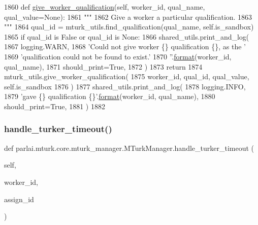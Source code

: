 \begin{DoxyCode}
1860     \textcolor{keyword}{def }\hyperlink{namespaceparlai_1_1mturk_1_1core_1_1dev_1_1mturk__utils_a631fbce36ff4d09422f29513460bc744}{give\_worker\_qualification}(self, worker\_id, qual\_name, qual\_value=None):
1861         \textcolor{stringliteral}{"""}
1862 \textcolor{stringliteral}{        Give a worker a particular qualification.}
1863 \textcolor{stringliteral}{        """}
1864         qual\_id = mturk\_utils.find\_qualification(qual\_name, self.is\_sandbox)
1865         \textcolor{keywordflow}{if} qual\_id \textcolor{keywordflow}{is} \textcolor{keyword}{False} \textcolor{keywordflow}{or} qual\_id \textcolor{keywordflow}{is} \textcolor{keywordtype}{None}:
1866             shared\_utils.print\_and\_log(
1867                 logging.WARN,
1868                 \textcolor{stringliteral}{'Could not give worker \{\} qualification \{\}, as the '}
1869                 \textcolor{stringliteral}{'qualification could not be found to exist.'}
1870                 \textcolor{stringliteral}{''}.\hyperlink{namespaceparlai_1_1chat__service_1_1services_1_1messenger_1_1shared__utils_a32e2e2022b824fbaf80c747160b52a76}{format}(worker\_id, qual\_name),
1871                 should\_print=\textcolor{keyword}{True},
1872             )
1873             \textcolor{keywordflow}{return}
1874         mturk\_utils.give\_worker\_qualification(
1875             worker\_id, qual\_id, qual\_value, self.is\_sandbox
1876         )
1877         shared\_utils.print\_and\_log(
1878             logging.INFO,
1879             \textcolor{stringliteral}{'gave \{\} qualification \{\}'}.\hyperlink{namespaceparlai_1_1chat__service_1_1services_1_1messenger_1_1shared__utils_a32e2e2022b824fbaf80c747160b52a76}{format}(worker\_id, qual\_name),
1880             should\_print=\textcolor{keyword}{True},
1881         )
1882 
\end{DoxyCode}
\mbox{\label{classparlai_1_1mturk_1_1core_1_1mturk__manager_1_1MTurkManager_ab93fd934d00fbf971ca299e77db152d5}} 
\subsubsection{\texorpdfstring{handle\+\_\+turker\+\_\+timeout()}{handle\_turker\_timeout()}}
{\footnotesize\ttfamily def parlai.\+mturk.\+core.\+mturk\+\_\+manager.\+M\+Turk\+Manager.\+handle\+\_\+turker\+\_\+timeout (\begin{DoxyParamCaption}\item[{}]{self,  }\item[{}]{worker\+\_\+id,  }\item[{}]{assign\+\_\+id }\end{DoxyParamCaption})}

